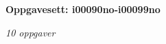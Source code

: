 \centerline{\bf Oppgavesett: i00090no-i00099no}
\vskip 10pt
\centerline{\it 10 oppgaver}\vskip 10pt
\vskip 10pt
